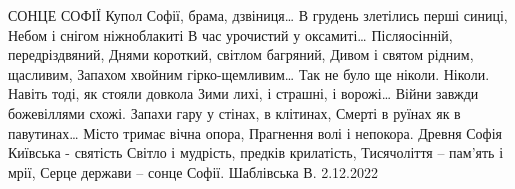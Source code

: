  
 
 
 
 



СОНЦЕ СОФІЇ 
Купол Софії, брама, дзвіниця…
В грудень злетілись перші синиці, 
Небом і снігом ніжноблакиті
В час урочистий у оксамиті…
Післяосінній, передріздвяний, 
Днями короткий, світлом багряний,
Дивом і святом рідним, щасливим,
Запахом хвойним гірко-щемливим…
Так не було ще ніколи. Ніколи.
Навіть тоді, як стояли довкола
Зими лихі, і страшні, і ворожі…
Війни завжди божевіллями схожі.
Запахи гару у стінах, в клітинах,
Смерті в руїнах як в павутинах…
Місто тримає вічна опора,
Прагнення волі і непокора.
Древня Софія Київська - святість
Світло і мудрість, предків крилатість,
Тисячоліття – пам'ять і мрії,
Серце держави – сонце Софії.
Шаблівська В.  2.12.2022

